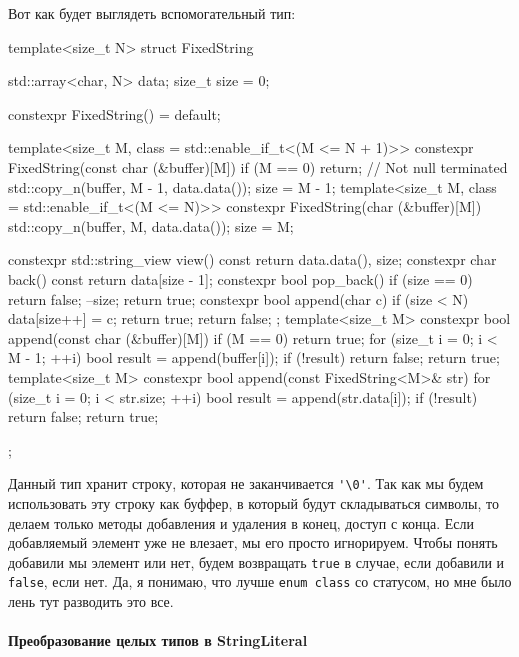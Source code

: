 Вот как будет выглядеть вспомогательный тип:
\begin{cppcode}
template<size_t N>
struct FixedString {

  std::array<char, N> data{};
  size_t size = 0;

  constexpr FixedString() = default;

  template<size_t M, class = std::enable_if_t<(M <= N + 1)>>
  constexpr FixedString(const char (&buffer)[M]) {
    if (M == 0)
      return;
    // Not null terminated
    std::copy_n(buffer, M - 1, data.data());
    size = M - 1;
  }
  template<size_t M, class = std::enable_if_t<(M <= N)>>
  constexpr FixedString(char (&buffer)[M]) {
    std::copy_n(buffer, M, data.data());
    size = M;
  }

  constexpr std::string_view view() const {
    return {data.data(), size};
  }
  constexpr char back() const {
    return data[size - 1];
  }
  constexpr bool pop_back() {
    if (size == 0)
      return false;
    --size;
    return true;
  }
  constexpr bool append(char c) {
    if (size < N) {
      data[size++] = c;
      return true;
    }
    return false;
  };
  template<size_t M>
  constexpr bool append(const char (&buffer)[M]) {
    if (M == 0)
      return true;
    for (size_t i = 0; i < M - 1; ++i) {
      bool result = append(buffer[i]);
      if (!result)
        return false;
    }
    return true;
  }
  template<size_t M>
  constexpr bool append(const FixedString<M>& str) {
    for (size_t i = 0; i < str.size; ++i) {
      bool result = append(str.data[i]);
      if (!result)
        return false;
    }
    return true;
  }
};
\end{cppcode}
Данный тип хранит строку, которая не заканчивается \verb"'\0'".
Так как мы будем использовать эту строку как буффер, в который будут складываться символы, то делаем только методы добавления и удаления в конец, доступ с конца.
Если добавляемый элемент уже не влезает, мы его просто игнорируем.
Чтобы понять добавили мы элемент или нет, будем возвращать \verb"true" в случае, если добавили и \verb"false", если нет.
Да, я понимаю, что лучше \verb"enum class" со статусом, но мне было лень тут разводить это все.

\paragraph{Преобразование целых типов в StringLiteral}

